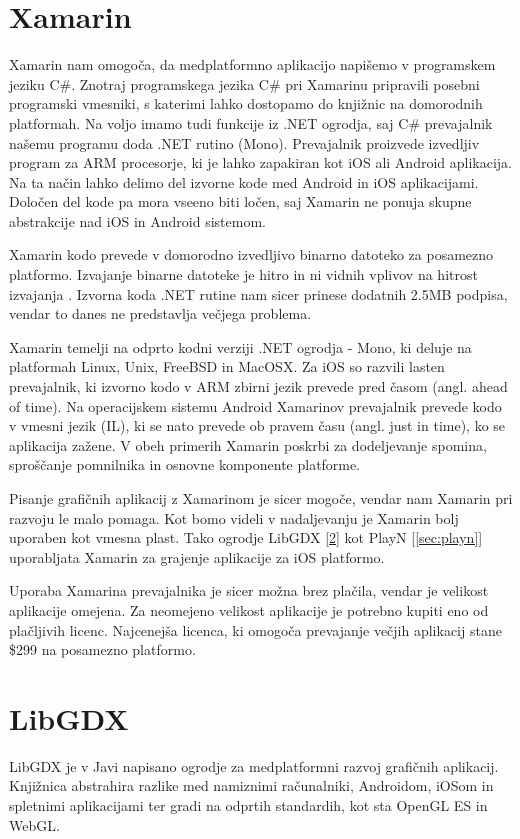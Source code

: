 \section{Xamarin}
\label{sec:xamarin}

Xamarin nam omogoča, da medplatformno aplikacijo napišemo v programskem jeziku C\#. Znotraj programskega jezika C\# pri Xamarinu pripravili posebni programski vmesniki, s katerimi lahko dostopamo do knjižnic na domorodnih platformah. Na voljo imamo tudi funkcije iz .NET ogrodja, saj C\# prevajalnik našemu programu doda .NET rutino (Mono). Prevajalnik proizvede izvedljiv program za ARM procesorje, ki je lahko zapakiran kot iOS ali Android aplikacija. Na ta način lahko delimo del izvorne kode med Android in iOS aplikacijami. Določen del kode pa mora vseeno biti ločen, saj Xamarin ne ponuja skupne abstrakcije nad iOS in Android sistemom. 

Xamarin kodo prevede v domorodno izvedljivo binarno datoteko za posamezno platformo. Izvajanje binarne datoteke je hitro in ni vidnih vplivov na hitrost izvajanja \cite{xamarin}. Izvorna koda .NET rutine nam sicer prinese dodatnih 2.5MB podpisa, vendar to danes ne predstavlja večjega problema.

Xamarin temelji na odprto kodni verziji .NET ogrodja - Mono, ki deluje na platformah Linux, Unix, FreeBSD in MacOSX. Za iOS so razvili lasten prevajalnik, ki izvorno kodo v ARM zbirni jezik prevede pred časom (angl. ahead of time). Na operacijskem sistemu Android Xamarinov prevajalnik prevede kodo v vmesni jezik (IL), ki se nato prevede ob pravem času (angl. just in time), ko se aplikacija zažene. V obeh primerih Xamarin poskrbi za dodeljevanje spomina, sproščanje pomnilnika in osnovne komponente platforme. %

Pisanje grafičnih aplikacij z Xamarinom je sicer mogoče, vendar nam Xamarin pri razvoju le malo pomaga. Kot bomo videli v nadaljevanju je Xamarin bolj uporaben kot vmesna plast. Tako ogrodje LibGDX [\ref{sec:libgdx}] kot PlayN [\ref{sec:playn}] uporabljata Xamarin za grajenje aplikacije za iOS platformo.

Uporaba Xamarina prevajalnika je sicer možna brez plačila, vendar je velikost aplikacije omejena. Za neomejeno velikost aplikacije je potrebno kupiti eno od plačljivih licenc. Najcenejša licenca, ki omogoča prevajanje večjih aplikacij stane \$299 na posamezno platformo.

\section{LibGDX}
\label{sec:libgdx}
LibGDX \cite{libgdx} je v Javi napisano ogrodje za medplatformni razvoj grafičnih aplikacij. Knjižnica abstrahira razlike med namiznimi računalniki, Androidom, iOSom in spletnimi aplikacijami ter gradi na odprtih standardih, kot sta OpenGL ES in WebGL.


